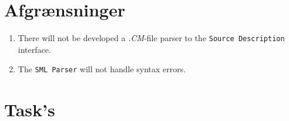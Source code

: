 \documentclass[a4paper,oneside]{memoir}
\begin{document}
\section{Afgrænsninger}


\begin{enumerate}
\item There will not be developed a \textit{.CM}-file parser to the
  \texttt{Source Description} interface.

\item The \texttt{SML Parser} will not handle syntax errors. 
\end{enumerate}


\section{Task's}
\end{document}
